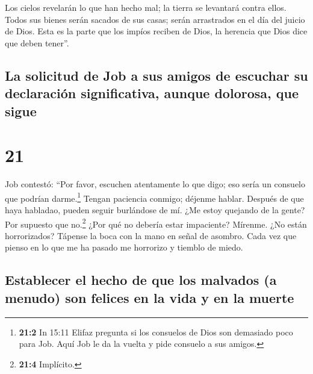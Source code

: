  Los cielos revelarán lo que han hecho mal; la tierra se
levantará contra ellos.  Todos sus bienes serán sacados
de sus casas; serán arrastrados en el día del juicio de Dios.
 Esta es la parte que los impíos reciben de Dios, la
herencia que Dios dice que deben tener''.

\hypertarget{la-solicitud-de-job-a-sus-amigos-de-escuchar-su-declaraciuxf3n-significativa-aunque-dolorosa-que-sigue}{%
\subsection{La solicitud de Job a sus amigos de escuchar su declaración
significativa, aunque dolorosa, que
sigue}\label{la-solicitud-de-job-a-sus-amigos-de-escuchar-su-declaraciuxf3n-significativa-aunque-dolorosa-que-sigue}}

\hypertarget{section-20}{%
\section{21}\label{section-20}}

 Job contestó:  ``Por favor, escuchen
atentamente lo que digo; eso sería un consuelo que podrían
darme.\footnote{\textbf{21:2} In 15:11 Elifaz pregunta si los consuelos
  de Dios son demasiado poco para Job. Aquí Job le da la vuelta y pide
  consuelo a sus amigos.}  Tengan paciencia conmigo;
déjenme hablar. Después de que haya habladao, pueden seguir burlándose
de mí.  ¿Me estoy quejando de la gente? Por supuesto que
no.\footnote{\textbf{21:4} Implícito.} ¿Por qué no debería estar
impaciente?  Mírenme. ¿No están horrorizados? Tápense la
boca con la mano en señal de asombro.  Cada vez que pienso
en lo que me ha pasado me horrorizo y tiemblo de miedo.

\hypertarget{establecer-el-hecho-de-que-los-malvados-a-menudo-son-felices-en-la-vida-y-en-la-muerte}{%
\subsection{Establecer el hecho de que los malvados (a menudo) son
felices en la vida y en la
muerte}\label{establecer-el-hecho-de-que-los-malvados-a-menudo-son-felices-en-la-vida-y-en-la-muerte}}

